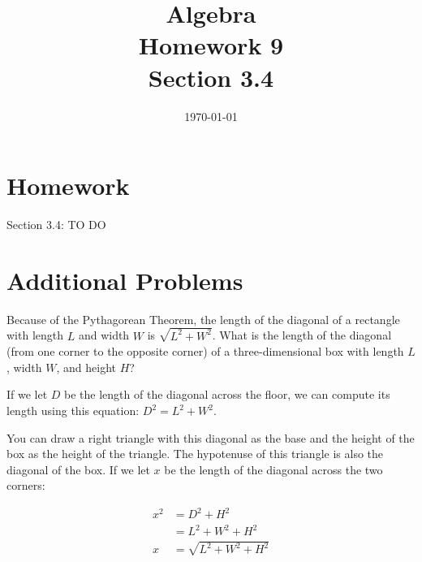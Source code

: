 \documentclass[letterpaper]{exam}
\title{Algebra \\ Homework 9 \\ Section 3.4 }
\author{}
\date{\today}
\begin{document}
  \maketitle

  \section{Homework}

  Section 3.4: TO DO

  \section{Additional Problems}

  \begin{questions}

    \question{} 
      Because of the Pythagorean Theorem, the length of the diagonal of a rectangle
      with length $L$ and width $W$ is $\sqrt{L^2 + W^2}$.  What is the length
      of the diagonal (from one corner to the opposite corner) of a
      three-dimensional box with length $L$, width $W$, and height $H$?

      \begin{solution}
      If we let $D$ be the length of the diagonal across the floor, we can compute
      its length using this equation: $D^2 = L^2 + W^2$.  

      You can draw a right triangle with this diagonal as the base and the height
      of the box as the height of the triangle.  The hypotenuse of this triangle is
      also the diagonal of the box.  If we let $x$ be the length of the diagonal
      across the two corners:

      \begin{align*}
        x^2 & = D^2 + H^2 \\
            & = L^2 + W^2 + H^2 \\
        x   & = \sqrt{ L^2 + W^2 + H^2 } \\
      \end{align*}

      \end{solution}




\end{questions}
\end{document}

